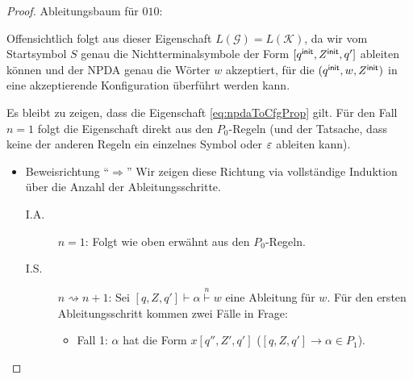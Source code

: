 \begin{proof}
    Ableitungsbaum für $010$:
    
    \begin{center}
    \vspace*{-\baselineskip}
    \end{center}
    
    Offensichtlich folgt aus dieser Eigenschaft $L(\mathcal{G}) = L(\mathcal{K})$, da wir vom Startsymbol $S$ genau die Nichtterminalsymbole der Form
    $[q^\mathsf{init}, Z^\mathsf{init}, q']$ ableiten können und der \ac{NPDA} genau die Wörter $w$ akzeptiert, für die  $(q^\mathsf{init}, w, Z^\mathsf{init})$ in eine akzeptierende Konfiguration überführt werden kann.
    
    Es bleibt zu zeigen, dass die Eigenschaft \eqref{eq:npdaToCfgProp} gilt.
    Für den Fall $n=1$ folgt die Eigenschaft direkt aus den $P_0$-Regeln (und der Tatsache, dass keine der anderen Regeln ein einzelnes Symbol oder $\varepsilon$ ableiten kann).
    
    \begin{itemize}
     \item Beweisrichtung "`$\Rightarrow$"'
     Wir zeigen diese Richtung via vollständige Induktion über die Anzahl der Ableitungsschritte.
     \begin{description}
      \item[I.A.] $n=1$: Folgt wie oben erwähnt aus den $P_0$-Regeln.
      \item[I.S.] $n\rightsquigarrow n+1$:
      Sei $[q,Z,q']\vdash\alpha\stackrel{n}{\vdash} w$ eine Ableitung für $w$. Für den ersten Ableitungsschritt kommen zwei Fälle in Frage:
      \begin{itemize}
      \item Fall 1: $\alpha$ hat die Form $x[q'', Z', q']$ ($[q,Z,q']\rightarrow\alpha \in P_1$).
      

\end{itemize}
\end{description}
\end{itemize}
\end{proof}
